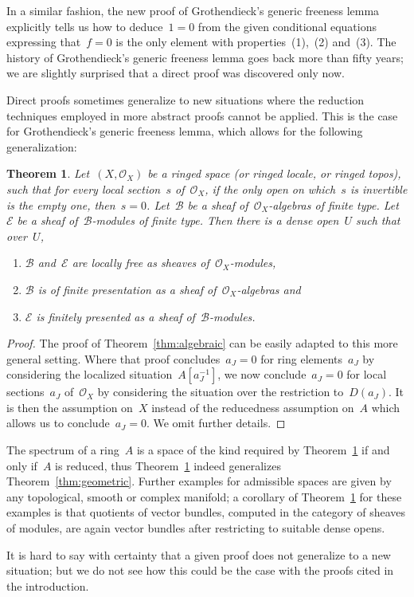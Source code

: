 \documentclass[oneside]{amsart}
\theoremstyle{definition}
\theoremstyle{plain}
\newtheorem{thm}[defn]{Theorem}
\theoremstyle{remark}
\newcommand{\E}{\mathcal{E}}
\newcommand{\B}{\mathcal{B}}
\renewcommand{\O}{\mathcal{O}}
\begin{document}
In a similar fashion, the new proof of Grothendieck's generic freeness lemma
explicitly tells us how to deduce~$1 = 0$ from the given conditional
equations expressing that~$f = 0$ is the only element with properties~(1),~(2)
and~(3). The history of Grothendieck's generic freeness lemma goes back more
than fifty years; we are slightly surprised that a direct proof was
discovered only now.

Direct proofs sometimes generalize to new situations where the reduction techniques
employed in more abstract proofs cannot be applied. This is the case for
Grothendieck's generic freeness lemma, which allows for the following
generalization:

\begin{thm}\label{thm:general-generic-freeness}
Let~$(X,\O_X)$ be a ringed space (or ringed locale, or ringed topos), such
that for every local section~$s$ of~$\O_X$, if the only open on which~$s$ is
invertible is the empty one, then~$s = 0$. Let~$\B$ be a sheaf
of~$\O_X$-algebras of finite type. Let~$\E$ be a sheaf of~$\B$-modules of finite type. Then there is a dense
open~$U$ such that over~$U$,
\begin{enumerate}
\item[(a)] $\B$ and~$\E$ are locally free as sheaves of~$\O_X$-modules,
\item[(b)] $\B$ is of finite presentation as a sheaf of~$\O_X$-algebras and
\item[(c)] $\E$ is finitely presented as a sheaf of~$\B$-modules.
\end{enumerate}
\end{thm}

\begin{proof}The proof of Theorem~\ref{thm:algebraic} can be easily adapted to
this more general setting. Where that proof concludes~$a_J = 0$ for ring
elements~$a_J$ by considering the localized situation~$A[a_J^{-1}]$, we now
conclude~$a_J = 0$ for local sections~$a_J$ of~$\O_X$ by considering the
situation over the restriction to~$D(a_J)$. It is then the assumption on~$X$
instead of the reducedness assumption on~$A$ which allows us to conclude~$a_J = 0$.
We omit further details.
\end{proof}

The spectrum of a ring~$A$ is a space of the kind required by
Theorem~\ref{thm:general-generic-freeness} if and only if~$A$ is reduced,
thus Theorem~\ref{thm:general-generic-freeness} indeed
generalizes Theorem~\ref{thm:geometric}. Further examples for admissible spaces
are given by any topological, smooth or complex manifold; a corollary
of Theorem~\ref{thm:general-generic-freeness} for these examples is that
quotients of vector bundles, computed in the category of sheaves of modules,
are again vector bundles after restricting to suitable dense opens.

It is hard to say with certainty that a given proof does not generalize to a
new situation; but we do not see how this could be the case with the proofs
cited in the introduction.


\printbibliography
\end{document}
